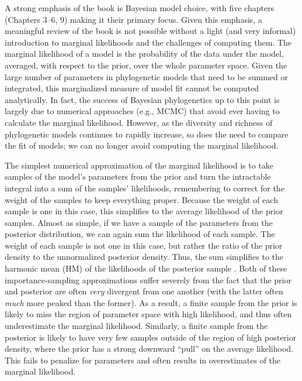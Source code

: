 \documentclass[letterpaper,12pt]{article}
\begin{document}
A strong emphasis of the book is Bayesian model choice, with five chapters
(Chapters 3--6, 9) making it their primary focus.
Given this emphasis, a meaningful review of the book is not possible without a
light (and very informal) introduction to marginal likelihoods and the
challenges of computing them.
The marginal likelihood of a model is the probability of the data under the
model, averaged, with respect to the prior, over the whole parameter space.
Given the large number of parameters in phylogenetic models that need
to be summed or integrated, this marginalized measure of model fit cannot
be computed analytically.
In fact, the success of Bayesian phylogenetics up to this point is largely due
to numerical approaches (e.g., MCMC) that avoid ever having to calculate the
marginal likelihood.
However, as the diversity and richness of phylogenetic models continues to
rapidly increase, so does the need to compare the fit of models;
we can no longer avoid computing the marginal likelihood.

The simplest numerical approximation of the marginal likelihood is to take
samples of the model's parameters from the prior and turn the intractable
integral into a sum of the samples' likelihoods, remembering to correct for the
weight of the samples to keep everything proper. Because the weight of each
sample is one in this case, this simplifies to the average likelihood of the
prior samples.
Almost as simple, if we have a sample of the parameters from the posterior
distribution, we can again sum the likelihood of each sample.
The weight of each sample is not one in this case, but rather the ratio of the
prior density to the unnormalized posterior density.
Thus, the sum simplifies to the harmonic mean (HM) of the likelihoods of the
posterior sample \citep{Newton1994}.
Both of these importance-sampling approximations suffer severely from the fact
that the prior and posterior are often \emph{very} divergent from one another
(with the latter often \emph{much} more peaked than the former).
As a result, a finite sample from the prior is likely to miss the region of
parameter space with high likelihood, and thus often underestimate the marginal
likelihood.
Similarly, a finite sample from the posterior is likely to have very few
samples outside of the region of high posterior density, where the prior has a
strong downward ``pull'' on the average likelihood. This fails to penalize for
parameters and often results in overestimates of the marginal likelihood.
\end{document}
